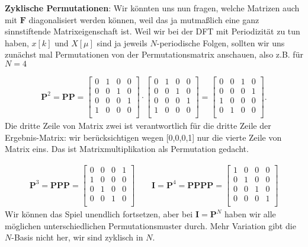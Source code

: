 \textbf{Zyklische Permutationen}: Wir könnten uns nun fragen, welche
Matrizen auch mit $\bm{F}$ diagonalisiert werden können, weil das ja mutmaßlich
eine ganz sinnstiftende Matrixeigenschaft ist.
%
Weil wir bei der DFT mit Periodizität zu tun haben, $x[k]$ und $X[\mu]$
sind ja jeweils $N$-periodische Folgen, sollten wir uns zunächst
mal Permutationen von
der Permutationsmatrix anschauen, also z.B. für $N=4$

\begin{align}
\bm{P}^2 = \bm{P}\bm{P} =
\begin{bmatrix}
0 & 1 & 0 & 0\\
0 & 0 & 1 & 0\\
0 & 0 & 0 & 1\\
1 & 0 & 0 & 0\\
\end{bmatrix}
\cdot
\begin{bmatrix}
0 & 1 & 0 & 0\\
0 & 0 & 1 & 0\\
0 & 0 & 0 & 1\\
1 & 0 & 0 & 0\\
\end{bmatrix}
=
\begin{bmatrix}
0 & 0 & 1 & 0\\
0 & 0 & 0 & 1\\
1 & 0 & 0 & 0\\
0 & 1 & 0 & 0\\
\end{bmatrix}.
\end{align}
%
Die dritte Zeile von Matrix zwei ist verantwortlich für die dritte Zeile der Ergebnis-Matrix: wir berücksichtigen wegen [0,0,0,1] nur die vierte Zeile von Matrix eins.
Das ist Matrixmultiplikation als Permutation gedacht.

\begin{align}
\bm{P}^3 = \bm{P}\bm{P}\bm{P} =
\begin{bmatrix}
0 & 0 & 0 & 1\\
1 & 0 & 0 & 0\\
0 & 1 & 0 & 0\\
0 & 0 & 1 & 0\\
\end{bmatrix}\qquad
\bm{I} = \bm{P}^4 = \bm{P}\bm{P}\bm{P}\bm{P} =
\begin{bmatrix}
1 & 0 & 0 & 0\\
0 & 1 & 0 & 0\\
0 & 0 & 1 & 0\\
0 & 0 & 0 & 1\\
\end{bmatrix}
\end{align}
Wir können das Spiel unendlich fortsetzen, aber bei $\bm{I} = \bm{P}^N$ haben
wir alle möglichen unterschiedlichen Permutationsmuster durch. Mehr Variation
gibt die $N$-Basis nicht her, wir sind zyklisch in $N$.

